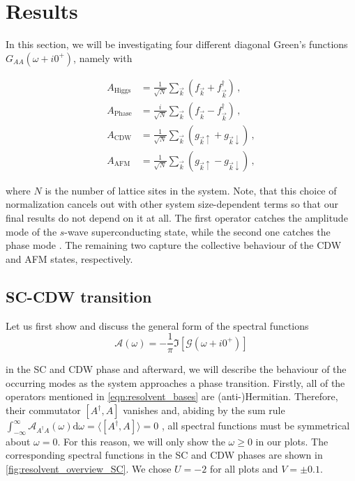 \documentclass[
    reprint, 
    aps,
    preprintnumbers,
    twocolumn,
    prb,
    superscriptaddress
]{revtex4-2}
\newcommand{\vk}{\vec{k}}
\newcommand{\up}{\uparrow}
\newcommand{\down}{\downarrow}
\begin{document}
\section{Results}\label{sec:results}

In this section, we will be investigating four different diagonal Green's functions $G_{AA}(\omega + i0^+)$, namely with

\begin{subequations}
    \label{eqn:resolvent_bases}
    \begin{align}
        A_\text{Higgs} &= \frac{1}{\sqrt{N}} \sum_{\vk} \left( f_{\vk} + f_{\vk}^\dagger \right)\,,\\
        A_\text{Phase} &= \frac{i}{\sqrt{N}} \sum_{\vk} \left( f_{\vk} - f_{\vk}^\dagger \right)\,,\\
        A_\text{CDW} &= \frac{1}{\sqrt{N}} \sum_{\vk} \left( g_{\vk \up} + g_{\vk \down} \right)\,,\\
        A_\text{AFM} &= \frac{1}{\sqrt{N}} \sum_{\vk} \left( g_{\vk \up} - g_{\vk \down} \right)\,,
    \end{align}
\end{subequations}

where $N$ is the number of lattice sites in the system. 
Note, that this choice of normalization cancels out with other system size-dependent terms so that our final results do not depend on it at all.
The first operator catches the amplitude mode of the $s$-wave superconducting state, while the second one catches the phase mode \cite{Fan22}.
The remaining two capture the collective behaviour of the CDW and AFM states, respectively.

\subsection{SC-CDW transition}

Let us first show and discuss the general form of the spectral functions
\begin{equation}
    \mathcal{A}(\omega) = -\frac{1}{\pi} \Im \left[ \mathcal{G}(\omega + i0^+) \right]
\end{equation}

in the SC and CDW phase and afterward, we will describe the behaviour of the occurring modes as the system approaches a phase transition.
\newline
Firstly, all of the operators mentioned in \eqref{eqn:resolvent_bases} are (anti-)Hermitian. 
Therefore, their commutator $[A^\dagger, A]$ vanishes and, 
abiding by the sum rule $\int_{-\infty}^\infty \mathcal{A}_{A^\dagger A} (\omega) \mathrm{d}\omega = \langle [A^\dagger, A] \rangle = 0$ \cite{rickayzen80},
all spectral functions must be symmetrical about $\omega=0$. 
For this reason, we will only show the $\omega \geq 0$ in our plots.
\newline
The corresponding spectral functions in the SC and CDW phases are shown in \autoref{fig:resolvent_overview_SC}.
We chose $U=-2$ for all plots and $V=\pm0.1$. 
\end{document}
